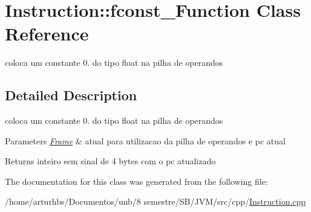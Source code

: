 \hypertarget{classInstruction_1_1fconst__0Function}{}\section{Instruction\+:\+:fconst\+\_\+Function Class Reference}
\label{classInstruction_1_1fconst__0Function}


coloca um constante 0. do tipo float na pilha de operandos  




\subsection{Detailed Description}
coloca um constante 0. do tipo float na pilha de operandos 


\begin{DoxyParams}{Parameters}
{\em \hyperlink{classFrame}{Frame}} & atual para utilizacao da pilha de operandos e pc atual \\
\hline
\end{DoxyParams}
\begin{DoxyReturn}{Returns}
inteiro sem sinal de 4 bytes com o pc atualizado 
\end{DoxyReturn}


The documentation for this class was generated from the following file\+:\begin{DoxyCompactItemize}
\item 
/home/arturhbs/\+Documentos/unb/8 semestre/\+S\+B/\+J\+V\+M/src/cpp/\hyperlink{Instruction_8cpp}{Instruction.\+cpp}\end{DoxyCompactItemize}
